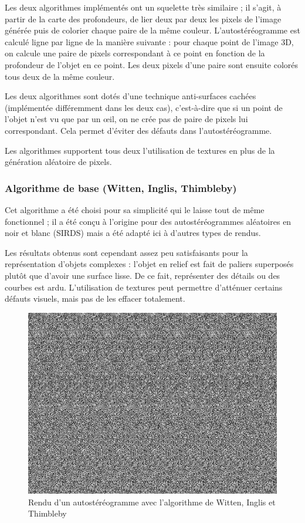 
  Les deux algorithmes implémentés ont un squelette très similaire ; il s'agit, à partir de la carte des profondeurs, de lier deux par deux les pixels de l'image générée puis de colorier chaque paire de la même couleur. L'autostéréogramme est calculé ligne par ligne de la manière suivante : pour chaque point de l'image 3D, on calcule une paire de pixels correspondant à ce point en fonction de la profondeur de l'objet en ce point. Les deux pixels d'une paire sont ensuite colorés tous deux de la même couleur. 

  Les deux algorithmes sont dotés d'une technique anti-surfaces cachées (implémentée différemment dans les deux cas), c'est-à-dire que si un point de l'objet n'est vu que par un \oe il, on ne crée pas de paire de pixels lui correspondant. Cela permet d'éviter des défauts dans l'autostéréogramme.

  Les algorithmes supportent tous deux l'utilisation de textures en plus de la génération aléatoire de pixels. 
  
  \subsubsection{Algorithme de base (Witten, Inglis, Thimbleby)}

  Cet algorithme a été choisi pour sa simplicité qui le laisse tout de même fonctionnel ; il a été conçu à l'origine pour des autostéréogrammes aléatoires en noir et blanc (SIRDS) mais a été adapté ici à d'autres types de rendus.

  Les résultats obtenus sont cependant assez peu satisfaisants pour la représentation d'objets complexes : l'objet en relief est fait de paliers superposés plutôt que d'avoir une surface lisse. De ce fait, représenter des détails ou des courbes est ardu. L'utilisation de textures peut permettre d'atténuer certains défauts visuels, mais pas de les effacer totalement.

\begin{figure}[h]
	\centering
	\includegraphics[scale=0.3]{autoste1.png}
	\caption{\label{fig:autoste1} Rendu d'un autostéréogramme avec l'algorithme de Witten, Inglis et Thimbleby \protect}
\end{figure}

